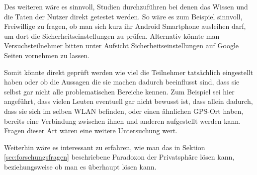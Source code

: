 Des weiteren wäre es sinnvoll, Studien durchzuführen bei denen das Wissen und die Taten der Nutzer direkt getestet werden. So wäre es zum Beispiel sinnvoll, Freiwillige zu fragen, ob man sich kurz ihr Android Smartphone ausleihen darf, um dort die Sicherheitseinstellungen zu prüfen. Alternativ könnte man Versuchsteilnehmer bitten unter Aufsicht Sicherheitseinstellungen auf Google Seiten vornehmen zu lassen.

Somit könnte direkt geprüft werden wie viel die Teilnehmer tatsächlich eingestellt haben oder ob die Aussagen die sie machen dadurch beeinflusst sind, dass sie selbst gar nicht alle problematischen Bereiche kennen. Zum Beispiel sei hier angeführt, dass vielen Leuten eventuell gar nicht bewusst ist, dass allein dadurch, dass sie sich im selben WLAN befinden, oder einen ähnlichen GPS-Ort haben, bereits eine Verbindung zwischen ihnen und anderen aufgestellt werden kann. Fragen dieser Art wären eine weitere Untersuchung wert.

Weiterhin wäre es interessant zu erfahren, wie man das in Sektion \ref{sec:forschungsfragen} beschriebene Paradoxon der Privatsphäre lösen kann, beziehungsweise ob man es überhaupt lösen kann.
